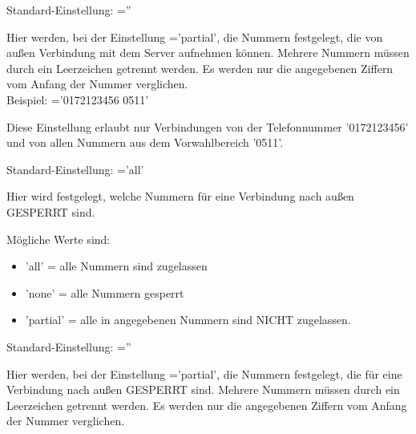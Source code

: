 \begin{description}

        Standard-Einstellung: =''

        Hier werden, bei der Einstellung ='partial', die Nummern festgelegt,
        die von außen Verbindung mit dem Server aufnehmen können.
        Mehrere Nummern müssen durch ein Leerzeichen getrennt werden.
        Es werden nur die angegebenen Ziffern vom Anfang der Nummer verglichen.
        \\
        Beispiel: ='0172123456 0511'

        Diese Einstellung erlaubt nur Verbindungen von der Telefonnummer '0172123456' und
        von allen Nummern aus dem Vorwahlbereich '0511'.


        Standard-Einstellung: ='all'

        Hier wird festgelegt, welche Nummern für eine Verbindung nach außen GESPERRT sind.

        Mögliche Werte sind:
        \begin{itemize}
            \item 'all' = alle Nummern sind zugelassen
            \item 'none' = alle Nummern gesperrt
            \item 'partial' = alle in
                angegebenen Nummern sind NICHT zugelassen.
        \end{itemize}


        Standard-Einstellung: =''

        Hier werden, bei der Einstellung ='partial', die Nummern festgelegt,
        die für eine Verbindung nach außen GESPERRT sind.
        Mehrere Nummern müssen durch ein Leerzeichen getrennt werden.
        Es werden nur die angegebenen Ziffern vom Anfang der Nummer verglichen.\\


\end{description}

